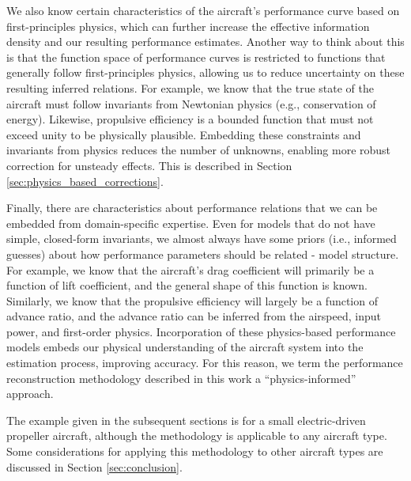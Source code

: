 \documentclass[conf]{new-aiaa}
\begin{document}
    We also know certain characteristics of the aircraft's performance curve based on first-principles physics, which can further increase the effective information density and our resulting performance estimates. Another way to think about this is that the function space of performance curves is restricted to functions that generally follow first-principles physics, allowing us to reduce uncertainty on these resulting inferred relations. For example, we know that the true state of the aircraft must follow invariants from Newtonian physics (e.g., conservation of energy). Likewise, propulsive efficiency is a bounded function that must not exceed unity to be physically plausible. Embedding these constraints and invariants from physics reduces the number of unknowns, enabling more robust correction for unsteady effects. This is described in Section \ref{sec:physics_based_corrections}.

    Finally, there are characteristics about performance relations that we can be embedded from domain-specific expertise. Even for models that do not have simple, closed-form invariants, we almost always have some priors (i.e., informed guesses) about how performance parameters should be related - model structure. For example, we know that the aircraft's drag coefficient will primarily be a function of lift coefficient, and the general shape of this function is known. Similarly, we know that the propulsive efficiency will largely be a function of advance ratio, and the advance ratio can be inferred from the airspeed, input power, and first-order physics. Incorporation of these physics-based performance models embeds our physical understanding of the aircraft system into the estimation process, improving accuracy. For this reason, we term the performance reconstruction methodology described in this work a ``physics-informed'' approach.

    The example given in the subsequent sections is for a small electric-driven propeller aircraft, although the methodology is applicable to any aircraft type. Some considerations for applying this methodology to other aircraft types are discussed in Section \ref{sec:conclusion}.
\end{document}
